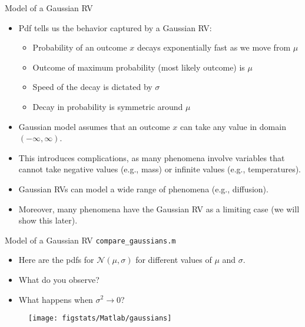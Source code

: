 \documentclass[9pt]{beamer}
\begin{document}
%
\begin{frame}{Model of a Gaussian RV}


\begin{itemize}
\setlength{\itemsep}{10pt}
\item Pdf tells us the behavior captured by a Gaussian RV: 

\begin{itemize}
\setlength{\itemsep}{5pt}
\item Probability of an outcome $x$ decays exponentially fast as we move from $\mu$
\item Outcome of maximum probability (most likely outcome) is $\mu$
\item Speed of the decay is dictated by $\sigma$
\item Decay in probability is symmetric around $\mu$
\end{itemize}

\item Gaussian model assumes that an outcome $x$ can take any value in domain $(-\infty,\infty)$. 

\item This introduces complications, as many phenomena involve variables that cannot take negative values (e.g., mass) or infinite values (e.g., temperatures).   

\item Gaussian RVs can model a wide range of phenomena (e.g., diffusion). 

\item Moreover, many phenomena have the Gaussian RV as a limiting case (we will show this later). 
\end{itemize}

\end{frame}

%
\begin{frame}{Model of a Gaussian RV \footnotesize{\texttt{compare\_gaussians.m}}}
\begin{itemize}
\setlength{\itemsep}{10pt}
\item Here are the pdfs for $\mathcal{N}(\mu,\sigma)$ for different values of $\mu$ and $\sigma$.
\item What do you observe?
\item What happens when $\sigma^2\to 0$?
\end{itemize}
\begin{figure}[!htb]
    \centering
	\texttt{[image: figstats/Matlab/gaussians]}
\end{figure}
\end{frame}
\end{document}
